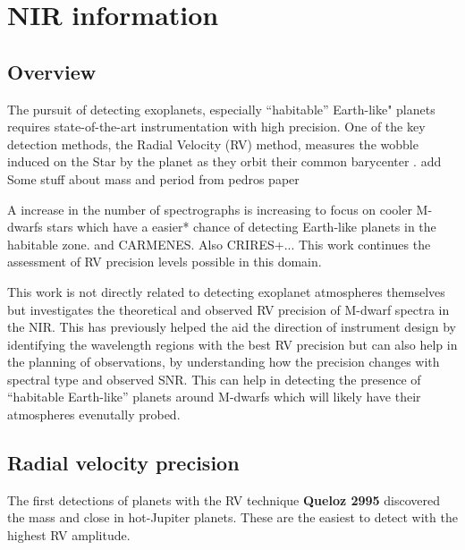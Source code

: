
\chapter{NIR information}

\label{cha:nir_content}

\section{Overview}

The pursuit of detecting exoplanets, especially ``habitable'' Earth-like" planets requires state-of-the-art instrumentation with high precision. One of the key detection methods, the Radial Velocity (RV) method, measures the wobble induced on the Star by the planet as they orbit their common barycenter .  {\red{} add Some stuff about mass and period from pedros paper}



A increase in the  number of {\nir} spectrographs is increasing to focus on cooler M-dwarfs stars which have a easier* chance of detecting Earth-like planets in the habitable zone.  and CARMENES. Also CRIRES+...
This work continues the assessment of RV precision levels possible in this domain.




This work is not directly related to detecting exoplanet atmospheres themselves but investigates the theoretical and observed RV precision of M-dwarf spectra in the NIR. This has previously helped the aid the direction of instrument design by identifying the wavelength regions with the best RV precision \citep{figueira_radial_2016} but can also help in the planning of observations, by understanding how the precision changes with spectral type and observed SNR. This can help in detecting the presence of ``habitable Earth-like'' planets around M-dwarfs which will likely have their atmospheres evenutally probed.


\section{Radial velocity precision}
The first detections of planets with the RV technique \textbf{Queloz 2995} discovered the mass and close in hot-Jupiter planets. These are the easiest to detect with the highest RV amplitude.

